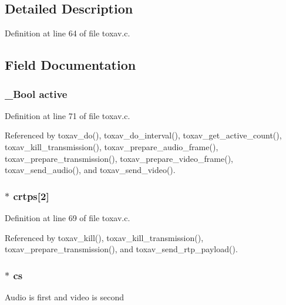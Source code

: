 \subsection{Detailed Description}


Definition at line 64 of file toxav.\+c.



\subsection{Field Documentation}
\hypertarget{struct___tox_av_call_a215df53a125f9b848dc883d9a1164430}{
\subsubsection[{active}]{\setlength{\rightskip}{0pt plus 5cm}\+\_\+\+Bool active}}\label{struct___tox_av_call_a215df53a125f9b848dc883d9a1164430}


Definition at line 71 of file toxav.\+c.



Referenced by toxav\+\_\+do(), toxav\+\_\+do\+\_\+interval(), toxav\+\_\+get\+\_\+active\+\_\+count(), toxav\+\_\+kill\+\_\+transmission(), toxav\+\_\+prepare\+\_\+audio\+\_\+frame(), toxav\+\_\+prepare\+\_\+transmission(), toxav\+\_\+prepare\+\_\+video\+\_\+frame(), toxav\+\_\+send\+\_\+audio(), and toxav\+\_\+send\+\_\+video().

\hypertarget{struct___tox_av_call_a2e84bee4a1898deac1f63f47235378eb}{
\subsubsection[{crtps}]{$\ast$ crtps\mbox{[}2\mbox{]}}}\label{struct___tox_av_call_a2e84bee4a1898deac1f63f47235378eb}


Definition at line 69 of file toxav.\+c.



Referenced by toxav\+\_\+kill(), toxav\+\_\+kill\+\_\+transmission(), toxav\+\_\+prepare\+\_\+transmission(), and toxav\+\_\+send\+\_\+rtp\+\_\+payload().

\hypertarget{struct___tox_av_call_ae88a02b5082b346e4c90541186364e99}{
\subsubsection[{cs}]{$\ast$ cs}}\label{struct___tox_av_call_ae88a02b5082b346e4c90541186364e99}
Audio is first and video is second 

